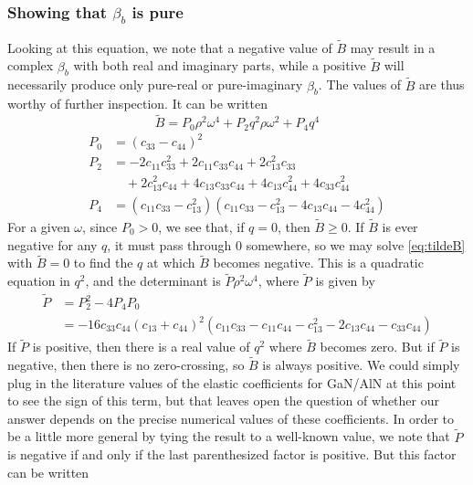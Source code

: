 \documentclass{article}
\begin{document}
\subsubsection{Showing that $\beta_b$ is pure}
Looking at this equation, we note that a negative value of $\tilde B$ may result in a complex $\beta_b$ with both real and imaginary parts, while a positive $\tilde B$ will necessarily produce only pure-real or pure-imaginary $\beta_b$.  The values of $\tilde B$ are thus worthy of further inspection.  It can be written
\begin{equation}
  \tilde B = P_0\rho^2\omega^4+P_2q^2\rho\omega^2+P_4q^4
  \label{eq:tildeB}
\end{equation}
\begin{align}
  P_0&=\left(c_{33} - c_{44}\right)^{2}\\
  P_2&=- 2 c_{11} c_{33}^{2} + 2 c_{11} c_{33} c_{44} + 2 c_{13}^{2} c_{33} \\&\quad + 2 c_{13}^{2} c_{44} + 4 c_{13} c_{33} c_{44} + 4 c_{13} c_{44}^{2} + 4 c_{33} c_{44}^{2}\\
  P_4&=\left(c_{11} c_{33} - c_{13}^{2}\right) \left(c_{11} c_{33} - c_{13}^{2} - 4 c_{13} c_{44} - 4 c_{44}^{2}\right)
\end{align}
For a given $\omega$, since $P_0>0$, we see that, if $q=0$, then $\tilde B\ge 0$.  If $\tilde B$ is ever negative for any $q$, it must pass through 0 somewhere, so we may solve \eqref{eq:tildeB} with $\tilde B=0$ to find the $q$ at which $\tilde B$ becomes negative.  This is a quadratic equation in $q^2$, and the determinant is $\tilde P\rho^2\omega^4$, where $\tilde P$ is given by
\begin{align}
  \tilde P &= P_2^2-4P_4P_0\\
    &=- 16 c_{33} c_{44} \left(c_{13} + c_{44}\right)^{2} \left(c_{11} c_{33} - c_{11} c_{44} - c_{13}^{2} - 2 c_{13} c_{44} - c_{33} c_{44}\right)
\end{align}
If $\tilde P$ is positive, then there is a real value of $q^2$ where $\tilde B$ becomes zero.  But if $\tilde P$ is negative, then there is no zero-crossing, so $\tilde B$ is always positive.  We could simply plug in the literature values of the elastic coefficients for GaN/AlN at this point to see the sign of this term, but that leaves open the question of whether our answer depends on the precise numerical values of these coefficients.  In order to be a little more general by tying the result to a well-known value, we note that  $\tilde P$ is negative if and only if the last parenthesized factor is positive.  But this factor can be written
\end{document}
